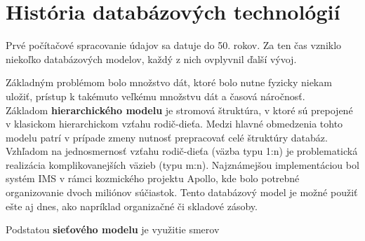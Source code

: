 \documentclass[a4paper,12pt]{article}
\begin{document}
	
	\section{História databázových technológií}
	
	Prvé počítačové spracovanie údajov sa datuje do 50. rokov. Za ten čas vzniklo niekoľko databázových modelov, každý z nich ovplyvnil ďalší vývoj.
	
	Základným problémom bolo množstvo dát, ktoré bolo nutne fyzicky niekam uložiť, prístup k takémuto veľkému množstvu dát a časová náročnosť. \\
	
	Základom \textbf{hierarchického modelu} je stromová štruktúra, v ktoré sú prepojené v klasickom hierarchickom vzťahu rodič-dieťa. Medzi hlavné obmedzenia tohto modelu patrí v prípade zmeny nutnosť prepracovať celé štruktúry databáz. Vzhľadom na jednosmernosť vzťahu rodič-dieťa (väzba typu 1:n) je problematická realizácia komplikovanejších väzieb (typu m:n). Najznámejšou implementáciou bol systém IMS v rámci kozmického projektu Apollo, kde bolo potrebné organizovanie dvoch miliónov súčiastok. Tento databázový model je možné použiť ešte aj dnes, ako napríklad organizačné či skladové zásoby.
	
	Podstatou \textbf{sieťového modelu} je využitie smerov
	
	
	
	
\end{document}
